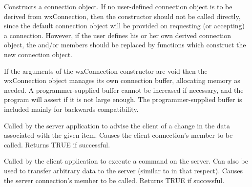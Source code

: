 



Constructs a connection object. If no user-defined connection
object is to be derived from wxConnection, then the constructor
should not be called directly, since the default connection
object will be provided on requesting (or accepting) a
connection. However, if the user defines his or her own derived
connection object, the\rtfsp
and/or  
members should be replaced by functions which construct the new
connection object.

If the arguments of the wxConnection constructor are void then
the wxConnection object manages its own connection buffer,
allocating memory as needed. A programmer-supplied buffer cannot
be increased if necessary, and the program will assert if it is
not large enough. The programmer-supplied buffer is included
mainly for backwards compatibility.

\label{wxddeconnectionadvise}


Called by the server application to advise the client of a change
in the data associated with the given item. Causes the client
connection's  member
to be called. Returns TRUE if successful.

\label{wxddeconnectionexecute}


Called by the client application to execute a command on the
server. Can also be used to transfer arbitrary data to the server
(similar to  in
that respect). Causes the server connection's  
member to be called. Returns TRUE if successful.


